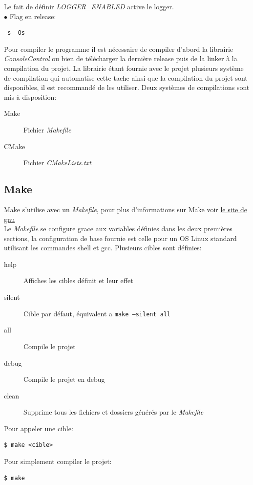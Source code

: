 \documentclass[article, backcover, french, nodocumentinfo]{upmethodology-document}
\begin{document}
				Le fait de définir \textit{LOGGER\_ENABLED} active le logger.\\
				$\bullet$ Flag en release:
				\begin{lstlisting}[breaklines=true,breakatwhitespace=true,breakindent=0pt,columns=fixed,keepspaces=true,frame=single,basicstyle=\footnotesize\sffamily]
-s -Os\end{lstlisting}
				Pour compiler le programme il est nécessaire de compiler d'abord la librairie \textit{ConsoleControl} ou bien de télécharger la dernière release puis de la linker à la compilation du projet. La librairie étant fournie avec le projet plusieurs système de compilation qui automatise cette tache ainsi que la compilation du projet sont disponibles, il est recommandé de les utiliser.
				Deux systèmes de compilations sont mis à disposition:
				\begin{description}
					\item[Make] Fichier \textit{Makefile}
					\item[CMake] Fichier \textit{CMakeLists.txt}
				\end{description}
		\subsection{Make}
			Make s'utilise avec un \textit{Makefile}, pour plus d'informations sur Make voir \href{https://www.gnu.org/software/make/}{le site de gnu}\\
			Le \textit{Makefile} se configure grace aux variables définies dans les deux premières sections, la configuration de base fournie est celle pour un OS Linux standard utilisant les commandes shell et gcc.
				Plusieurs cibles sont définies:
				\begin{description}
					\item[help] Affiches les cibles définit et leur effet
					\item[silent] Cible par défaut, équivalent a \texttt{make --silent all}
					\item[all] Compile le projet
					\item[debug] Compile le projet en debug
					\item[clean] Supprime tous les fichiers et dossiers générés par le \textit{Makefile}
				\end{description}
				Pour appeler une cible:
				\begin{lstlisting}[breaklines=true,breakatwhitespace=true,breakindent=0pt,columns=fixed,keepspaces=true,frame=single,basicstyle=\footnotesize\sffamily]
$ make <cible>\end{lstlisting}
				Pour simplement compiler le projet:
				\begin{lstlisting}[breaklines=true,breakatwhitespace=true,breakindent=0pt,columns=fixed,keepspaces=true,frame=single,basicstyle=\footnotesize\sffamily]
$ make\end{lstlisting}
\end{document}
